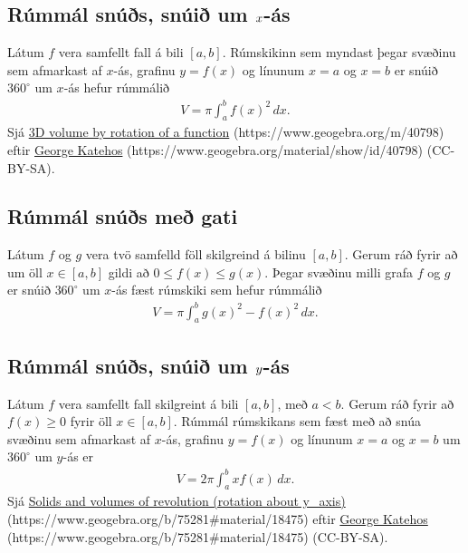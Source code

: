 \documentclass[a4paper,10pt,icelandic]{sphinxmanual}
\begin{document}

\subsection{Rúmmál snúðs, snúið um \protect\(x\protect\)-ás}
\label{kafli07:rummal-snus-snui-um-as}\label{kafli07:index-3}
Látum \(f\) vera samfellt fall á bili \([a, b]\). Rúmskikinn sem
myndast þegar svæðinu sem afmarkast af \(x\)-ás, grafinu
\(y=f(x)\) og línunum \(x=a\) og \(x=b\) er snúið
\(360^\circ\) um \(x\)-ás hefur rúmmálið
\begin{equation*}
\begin{split}V=\pi\int_a^b f(x)^2\,dx.\end{split}
\end{equation*}
Sjá  \href{https://www.geogebra.org/m/40798}{3D volume by rotation of a function} (https://www.geogebra.org/m/40798)
eftir \href{https://www.geogebra.org/material/show/id/40798}{George Katehos} (https://www.geogebra.org/material/show/id/40798) (CC-BY-SA).


\subsection{Rúmmál snúðs með gati}
\label{kafli07:rummal-snus-me-gati}\label{kafli07:index-4}
Látum \(f\) og \(g\) vera tvö samfelld föll skilgreind á bilinu
\([a, b]\). Gerum ráð fyrir að um öll \(x\in [a, b]\) gildi að
\(0\leq f(x)\leq
g(x)\). Þegar svæðinu milli grafa \(f\) og \(g\) er snúið
\(360^\circ\) um \(x\)-ás fæst rúmskiki sem hefur rúmmálið
\begin{equation*}
\begin{split}V=\pi\int_a^b g(x)^2-f(x)^2\,dx.\end{split}
\end{equation*}

\subsection{Rúmmál snúðs, snúið um \protect\(y\protect\)-ás}
\label{kafli07:index-5}\label{kafli07:id1}
Látum \(f\) vera samfellt fall skilgreint á bili \([a, b]\), með
\(a<b\). Gerum ráð fyrir að \(f(x)\geq 0\) fyrir öll
\(x\in [a, b]\). Rúmmál rúmskikans sem fæst með að snúa svæðinu sem
afmarkast af \(x\)-ás, grafinu \(y=f(x)\) og línunum \(x=a\)
og \(x=b\) um \(360^\circ\) um \(y\)-ás er
\begin{equation*}
\begin{split}V=2\pi\int_a^b xf(x)\,dx.\end{split}
\end{equation*}
Sjá \href{https://www.geogebra.org/b/75281\#material/18475}{Solids and volumes of revolution (rotation about y\_axis)} (https://www.geogebra.org/b/75281\#material/18475)
eftir \href{https://www.geogebra.org/b/75281\#material/18475}{George Katehos} (https://www.geogebra.org/b/75281\#material/18475) (CC-BY-SA).
\end{document}
